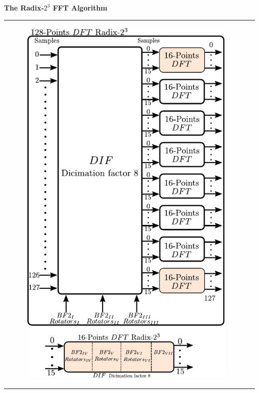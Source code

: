 \begin{frame}
\begin{block}{\centering \textbf{The Radix-$2^3$ FFT  Algorithm}}
\begin{tabular}[c]{lr}
\begin{minipage}[t]{0.45\linewidth}
\begin{figure}[h!]
    \includegraphics[height=0.6\paperheight]{./image/BloquesDft.pdf}
    \end{figure}
      \end{minipage}
    \end{tabular}
  \end{block}

\end{frame}




